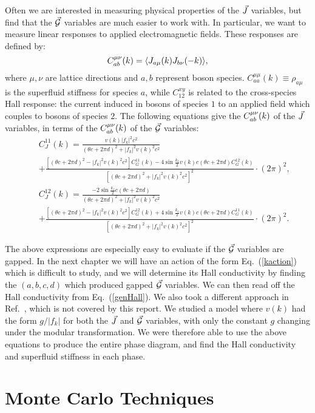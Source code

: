 Often we are interested in measuring physical properties of the $\vec{J}$ variables, but find that the $\vec{\mathcal{G}}$ variables are much easier to work with. In particular, we want to measure linear responses to applied electromagnetic fields. These responses are defined by:
\begin{equation}
C^{\mu\nu}_{ab}(k)=\langle J_{a\mu}(k) J_{b\nu}(-k)\rangle,
\end{equation}
where $\mu,\nu$ are lattice directions and $a,b$ represent boson species. $C^{\mu\mu}_{aa}(k)\equiv \rho_{a\mu}$ is the superfluid stiffness for species $a$, while $C^{xy}_{12}$ is related to the cross-species Hall response: the current induced in bosons of species $1$ to an applied field which couples to bosons of species $2$. The following equations give the $C^{\mu\nu}_{ab}(k)$ of the $\vec{J}$ variables, in terms of the $C^{\mu\nu}_{ab}(k)$ of the $\vec{\mathcal{G}}$ variables:
\begin{eqnarray}
&&C_J^{11}(k)=\frac{v(k)|f_k|^2c^2}{(\theta c+2\pi d)^2+|f_k|^2v(k)^2c^2}\\
&&+\frac{[(\theta c+2\pi d)^2-|f_k|^2v(k)^2c^2]C_G^{11}(k)-4\sin{\frac{k_z}{2}}v(k)c(\theta c+2\pi d)C_G^{12}(k)}{[(\theta c+2\pi d)^2+|f_k|^2v(k)^2c^2]^2}\cdot (2\pi)^2,\nonumber\\
&&C_J^{12}(k)=\frac{-2\sin{\frac{k_z}{2}}c(\theta c+2\pi d)}{(\theta c+2\pi d)^2+|f_k|^2v(k)^2c^2}\label{genHall}\\
&&+\frac{[(\theta c+2\pi d)^2-|f_k|^2v(k)^2c^2]C_G^{12}(k)+4\sin{\frac{k_z}{2}}v(k)c(\theta c+2\pi d)C_G^{11}(k)}{[(\theta c+2\pi d)^2+|f_k|^2v(k)^2c^2]^2}\cdot (2\pi)^2.\nonumber
\end{eqnarray}

The above expressions are especially easy to evaluate if the $\vec{\mathcal{G}}$ variables are gapped. In the next chapter we will have an action of the form Eq.~(\ref{kaction}) which is difficult to study, and we will determine its Hall conductivity by finding the $(a,b,c,d)$ which produced gapped $\vec{\mathcal{G}}$ variables. We can then read off the Hall conductivity from Eq.~(\ref{genHall}). We also took a different approach in Ref.~\cite{Gen2Loops}, which is not covered by this report. We studied a model where $v(k)$ had the form $g/|f_k|$ for both the $\vec{J}$ and $\vec{\mathcal{G}}$ variables, with only the constant $g$ changing under the modular transformation. We were therefore able to use the above equations to produce the entire phase diagram, and find the Hall conductivity and superfluid stiffness in each phase.

\section{Monte Carlo Techniques}

